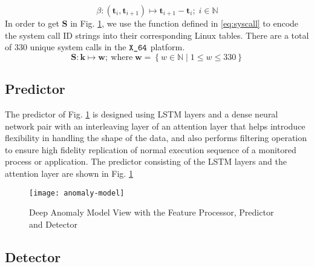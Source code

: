 \begin{equation}
\bm{\mathbb{\beta}}:\left(\mathbf{t}_i,\mathbf{t}_{i+1}\right)
\longmapsto 
\mathbf{t}_{i+1} -\mathbf{t}_i; \; i \in \bm{\mathbb{N}}  
\label{eq:beta}
\end{equation}
In order to get $ \bm{\mathbf{S}} $ in Fig. 
\ref{fig:rnn-model}, we 
use the function defined in \eqref{eq:syscall} to encode the 
system call ID 
strings
into their corresponding Linux tables. There are a total of $ 
330 $ unique 
system calls in the $ \verb|X_64| $ platform.
\begin{equation}
\bm{\mathbf{S}}: \bm{\mathbf{k}} \longmapsto 
\bm{\mathbf{w}}; \:
\text{where}\; \bm{\mathbf{w}}=\left\lbrace \mathit{w} \in 
\bm{\mathbb{N}} 
\mid 1 \leq \mathit{w} \leq 330 \right\rbrace 
\label{eq:syscall}
\end{equation} 

\subsection{Predictor}
\label{subsec:predictor}
The predictor of Fig. \ref{fig:rnn-model} is 
designed using LSTM layers and a dense neural network pair 
with an interleaving layer of an attention layer that helps 
introduce flexibility in handling the shape of the data, and 
also performs filtering operation to ensure high fidelity 
replication of normal execution sequence of a monitored 
process or application. The predictor consisting of the LSTM 
layers and the attention layer are shown in Fig. 
\ref{fig:rnn-model}
\begin{figure}[!t]
	\centering
	\texttt{[image: anomaly-model]} 
	\caption{Deep Anomaly Model View with the Feature 
	Processor, Predictor and Detector}
	\label{fig:rnn-model}
\end{figure}

\subsection{Detector}
\label{subsec:detector}
